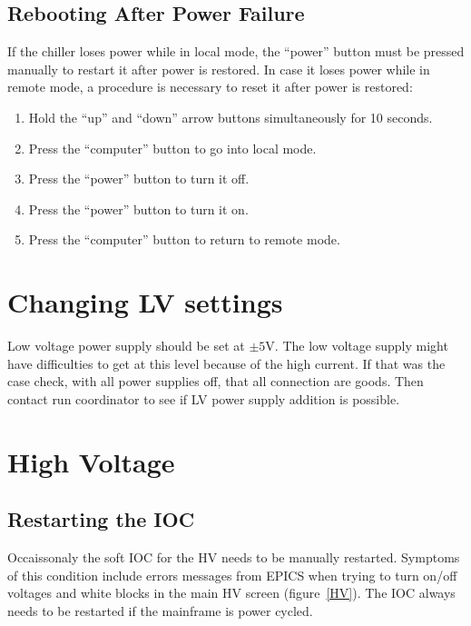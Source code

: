 \documentclass[12pt]{article}
\begin{document}
     \subsection{Rebooting After Power Failure}
     If the chiller loses power while in local mode, the ``power'' button must be pressed manually to restart it after power is restored.  In case it loses power while in remote mode, a procedure is necessary to reset it after power is restored:
   {\footnotesize
     \begin{enumerate}
         \item Hold the ``up'' and ``down'' arrow buttons simultaneously for 10 seconds.
         \item Press the ``computer'' button to go into local mode.
         \item Press the ``power'' button to turn it off.
         \item Press the ``power'' button to turn it on.
         \item Press the ``computer'' button to return to remote mode.
    \end{enumerate}
    }

   \section{Changing LV settings}
      Low voltage power supply should be set at $\pm5$V. The low voltage supply might have difficulties to get at this level because of the high current. If that was the case check, with all power supplies off, that all connection are goods. Then contact run coordinator to see if LV power supply addition is possible. 

   \section{High Voltage}
   \subsection{Restarting the IOC}
   Occaissonaly the soft IOC for the HV needs to be manually restarted.  Symptoms of this condition include errors messages from EPICS when trying to turn on/off voltages and white blocks in the main HV screen (figure~\ref{HV}).  The IOC always needs to be restarted if the mainframe is power cycled.  
   
\end{document}
